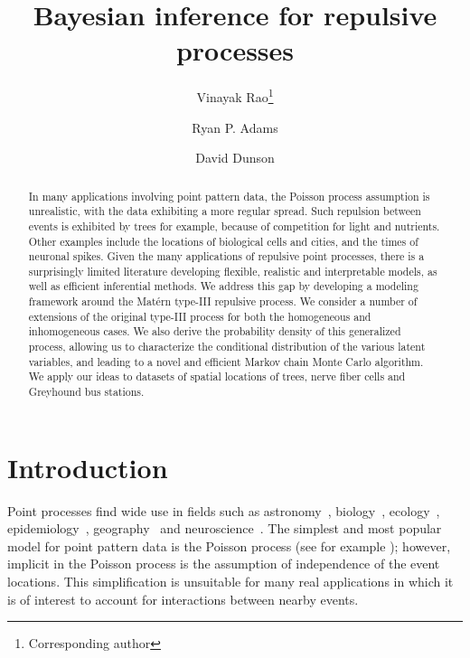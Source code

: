 \documentclass{statsoc}
\title{Bayesian inference for \matern repulsive processes}
\author{Vinayak Rao\thanks{Corresponding author}}
\author{Ryan P. Adams}
\author{David Dunson}
\date{}
\begin{document}
\maketitle
\begin{abstract}
In many applications involving point pattern data, the Poisson process assumption is unrealistic, with the data exhibiting a
more regular spread.
Such repulsion between events is exhibited by trees for example, because of competition for light and nutrients. Other examples include the locations of 
biological cells and cities, and the times of neuronal spikes. Given the many 
applications of repulsive point processes, there is a surprisingly limited literature developing flexible, realistic and interpretable models, as well as 
efficient inferential 
methods.  We address this gap by developing a modeling framework around the Mat\'ern type-III repulsive process. 
We consider a number of extensions of the original \matern type-III process for both the homogeneous and inhomogeneous cases.
We also derive the probability density of this generalized \matern process, allowing us to characterize the conditional distribution of the various 
latent variables, and leading to a novel and efficient Markov chain Monte Carlo algorithm.
We apply our ideas to datasets of spatial locations of trees, nerve
fiber cells and Greyhound bus stations.
\end{abstract}



\section{Introduction}

Point processes find wide use in fields such as 
astronomy~\citep{Peebles74}, biology~\citep{WallSar11}, ecology~\citep{Hill1973}, epidemiology~\citep{Knox04}, geography~\citep{kendall39} and 
neuroscience~\citep{Brown2004a}. The simplest and most popular model for point pattern data is the Poisson process (see for example \citet{DalVer2008a}); however, implicit in the 
Poisson process is the assumption of independence of the event locations. This simplification is unsuitable for many
real applications in which it is of interest to account for interactions between nearby events. 
\end{document}
